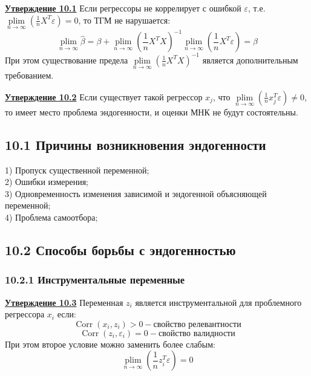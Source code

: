 \documentclass[a0,final]{a0poster}
\DeclareMathOperator{\Corr}{Corr}
\DeclareMathOperator*{\plim}{plim}
\begin{document}
\begin{multicols}{4}
\begin{tcolorbox}[colback=blue!5!white,colframe=blue!75!black]
\textbf{\underline{Утверждение 10.1}} Если регрессоры не коррелирует с ошибкой $\varepsilon$, т.е. $\plim\limits_{n \to \infty}(\frac{1}{n}X^T\varepsilon)=0$, то ТГМ не нарушается:
\[
\plim\limits_{n \to \infty}\hat{\beta}=
  \beta + \plim\limits_{n \to \infty} (\frac{1}{n}X^TX)^{-1}  \plim\limits_{n \to \infty} (\frac{1}{n}X^T\varepsilon) =
  \beta
\]
При этом существование предела $\plim\limits_{n \to \infty}(\frac{1}{n}X^TX)^{-1}$ является дополнительным требованием.
\end{tcolorbox}

\begin{tcolorbox}[colback=blue!5!white,colframe=blue!75!black]
\textbf{\underline{Утверждение 10.2}} Если существует такой регрессор $x_j$, что $\plim\limits_{n \to \infty}(\frac{1}{n}x^T_j\varepsilon) \neq 0$, то имеет место проблема эндогенности, и оценки МНК не будут состоятельны.
\end{tcolorbox}

\subsection*{\textbf{10.1 Причины возникновения эндогенности}}
1) Пропуск существенной переменной; \\
2) Ошибки измерения; \\
3) Одновременность изменения зависимой и эндогенной объясняющей переменной; \\
4) Проблема самоотбора;

\subsection*{\textbf{10.2 Способы борьбы с эндогенностью}}

\subsubsection*{\textbf{10.2.1 Инструментальные переменные}}

\begin{tcolorbox}[colback=green!5!white,colframe=green!75!black]
\textbf{\underline{Утверждение 10.3}} Переменная $z_i$ является инструментальной для проблемного регрессора $x_i$ если:
\[ \Corr(x_i,z_i) > 0  - \textit{свойство релевантности} \]
\[ \Corr(z_i,\varepsilon_i)=0  - \textit{свойство валидности} \]
При этом второе условие можно заменить более слабым:
\[\plim\limits_{n \to \infty}(\frac{1}{n}z_i^T\varepsilon) = 0\]
\end{tcolorbox}


\end{multicols}
\end{document}
